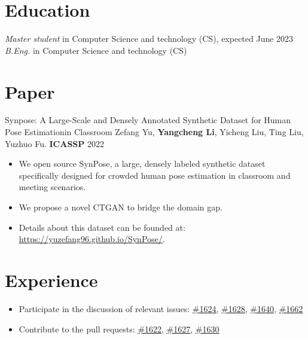 \documentclass{resume}
\begin{document}



\section{Education}
\textit{Master student} in Computer Science and technology (CS), expected June 2023
\textit{B.Eng.} in Computer Science and technology (CS)

\section{Paper}
Synpose: A Large-Scale and Densely Annotated Synthetic Dataset for Human Pose Estimationin Classroom Zefang Yu,
\textbf{Yangcheng Li}, Yicheng Liu, Ting Liu, Yuzhuo Fu. \textbf{ICASSP} 2022
\begin{itemize}
  \item We open source SynPose, a large, densely labeled synthetic dataset specifically designed for crowded human pose estimation in classroom and meeting scenarios.
  \item We propose a novel CTGAN to bridge the domain gap.
  \item Details about this dataset can be founded at: {\underline{\url{https://yuzefang96.github.io/SynPose/}}}.
\end{itemize}

\section{Experience}
\begin{itemize}
  \item Participate in the discussion of relevant issues: {\underline{\href{https://github.com/open-mmlab/mmaction2/issues/1624}{\#1624}}}, {\underline{\href{https://github.com/open-mmlab/mmaction2/issues/1628}{\#1628}}}, {\underline{\href{https://github.com/open-mmlab/mmaction2/issues/1640}{\#1640}}}, {\underline{\href{https://github.com/open-mmlab/mmaction2/issues/1662}{\#1662}}}
  \item Contribute to the pull requests: {\underline{\href{https://github.com/open-mmlab/mmaction2/pull/1622}{\#1622}}}, {\underline{\href{https://github.com/open-mmlab/mmaction2/pull/1627}{\#1627}}}, {\underline{\href{https://github.com/open-mmlab/mmaction2/pull/1630}{\#1630}}}
\end{itemize}
\end{document}
